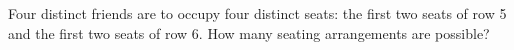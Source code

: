Four distinct friends are to occupy four distinct seats: the first two seats of row 5 and the first two seats of row 6. How many seating arrangements are possible?
